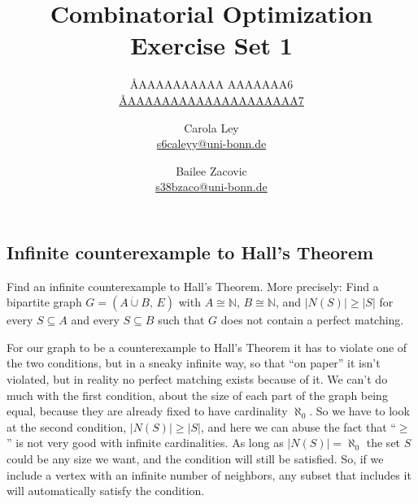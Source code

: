 \documentclass{article}
\title{Combinatorial Optimization \\ Exercise Set 1}
\author{
  \AA{AAAAAAAAAA AAAAAAA}{6} \\
  \href{mailto:\AA{AAAAAAAAAAAAAAAAAAAA}{7}}{\AA{AAAAAAAAAAAAAAAAAAAA}{7}}
  \and
  Carola Ley \\
  \href{mailto:s6caleyy@uni-bonn.de}{s6caleyy@uni-bonn.de}
  \and
  Bailee Zacovic \\
  \href{mailto:s38bzaco@uni-bonn.de}{s38bzaco@uni-bonn.de}
}
\newcommand{\N}{\mathbb{N}}
\begin{document}
  \maketitle

  \setcounter{section}{1}
  \subsection{Infinite counterexample to Hall's Theorem}
  \begin{centerframebox}
    Find an infinite counterexample to Hall's Theorem. More precisely:
    Find a bipartite graph $G = (A \dot\cup B,\, E)$ with $A \cong \N$, $B \cong \N$, and $|N(S)| \geq |S|$ for
    every $S \subseteq A$ and every $S \subseteq B$ such that $G$ does not contain a perfect matching.
  \end{centerframebox}

  For our graph to be a counterexample to Hall's Theorem it has to violate one of the two conditions,
  but in a sneaky infinite way, so that ``on paper'' it isn't violated, but in reality no perfect matching exists because of it.
  We can't do much with the first condition, about the size of each part of the graph being equal,
  because they are already fixed to have cardinality $\aleph_0$.
  So we have to look at the second condition, $|N(S)| \geq |S|$,
  and here we can abuse the fact that ``$\geq$'' is not very good with infinite cardinalities.
  As long as $|N(S)| = \aleph_0$ the set $S$ could be any size we want, and the condition will still be satisfied.
  So, if we include a vertex with an infinite number of neighbors, any subset that includes it will automatically satisfy the condition.

  \begin{center}
  \end{center}
\end{document}
